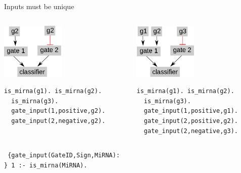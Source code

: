 \documentclass[10pt,dvipsnames]{beamer}
\begin{document}
\begin{frame}[fragile]{Inputs must be unique}
 \begin{columns}  
 \begin{column}{0.5\textwidth}
 \begin{center}\includegraphics[width=3cm]{constraints_02.png}\end{center}
 \color{my_example_color}
  \begin{Verbatim}[fontsize=\small]
  is_mirna(g1). is_mirna(g2).
  is_mirna(g3).
  gate_input(1,positive,g2).
  gate_input(2,negative,g2).
 \end{Verbatim}
 \end{column}
 \begin{column}{0.5\textwidth}
 \begin{center}\includegraphics[width=3cm]{constraints_03.png}\end{center}
  \color{my_example_color}
  \begin{Verbatim}[fontsize=\small]
  is_mirna(g1). is_mirna(g2).
  is_mirna(g3).
  gate_input(1,positive,g1).
  gate_input(2,positive,g2).
  gate_input(2,negative,g3).
 \end{Verbatim}
 \end{column}
 \end{columns}
 \vspace{1cm}
 \texttt{
  \{gate\_input(GateID,Sign,MiRNA):\\
   \} 1 :- is\_mirna(MiRNA).
 }
 
\end{frame}
\end{document}
